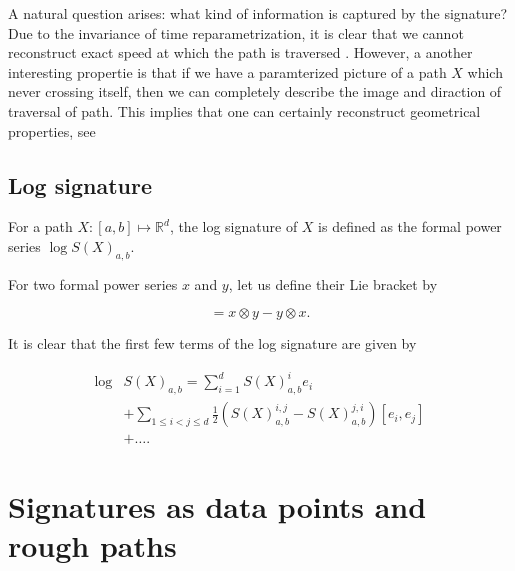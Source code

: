 A natural question arises: what kind of information is captured by the signature?
Due to the invariance of time reparametrization, it is clear that we cannot reconstruct exact speed at which the path is traversed \cite{chevyrev2016primer}.
However, a another interesting propertie is that if we have a paramterized picture of a  path $X$ which never crossing itself, then we can completely describe the image and diraction of traversal of path. This implies that one can certainly
reconstruct geometrical properties, see \cite{lyons2017hyperbolic, chang2019insertion, geng2017reconstruction}



\subsection{Log signature}%
\label{sub:log_signature}


For a path $X : [a, b] \mapsto \mathbb{R}^d$, the log signature of $X$ is defined as the formal power series $\log S(X)_{a,b}$.

For two formal power series $x$ and $y$, let us define their Lie bracket by

\begin{equation}
[x, y] = x \otimes y - y \otimes x. \tag{1.55}
\end{equation}

It is clear that the first few terms of the log signature are given by

\begin{equation}
    \begin{split}
\log&  S(X)_{a,b}  = \sum_{i=1}^{d} S(X)^i_{a,b} e_i \\  &+ \sum_{1 \leq i < j \leq d} \frac{1}{2} \left( S(X)^{i,j}_{a,b}  - S(X)^{j,i}_{a,b} \right) [e_i, e_j] \\ &  + \dots .
    \end{split}
\end{equation}


\section{Signatures as data points and rough paths}%
\label{sub:signatures_as_data_points_and_rough_paths}








